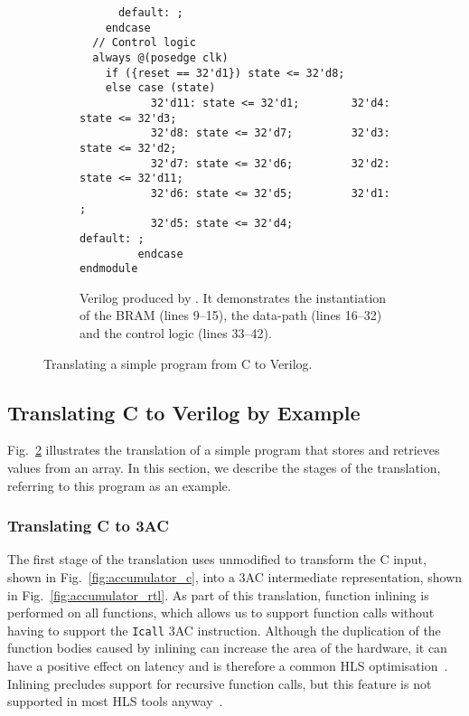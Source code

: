 \begin{figure}
\begin{subfigure}[b]{0.65\linewidth}
\begin{verbatim}
      default: ;
    endcase
  // Control logic
  always @(posedge clk)
    if ({reset == 32'd1}) state <= 32'd8;
    else case (state)
           32'd11: state <= 32'd1;        32'd4: state <= 32'd3;
           32'd8: state <= 32'd7;         32'd3: state <= 32'd2;
           32'd7: state <= 32'd6;         32'd2: state <= 32'd11;
           32'd6: state <= 32'd5;         32'd1: ;
           32'd5: state <= 32'd4;         default: ;
         endcase
endmodule
\end{verbatim}
\caption{Verilog produced by \vericert{}. It demonstrates the instantiation of the \gls{BRAM} (lines 9--15), the data-path (lines 16--32) and the control logic (lines 33--42).}\label{fig:accumulator_v}
\end{subfigure}
\caption{Translating a simple program from C to Verilog.}\label{fig:accumulator_c_rtl}
\end{figure}

\subsection{Translating C to Verilog by Example}
Fig.~\ref{fig:accumulator_c_rtl} illustrates the translation of a simple program that stores and retrieves values from an array.
In this section, we describe the stages of the \vericert{} translation, referring to this program as an example.

\subsubsection{Translating C to 3AC}

The first stage of the translation uses unmodified \compcert{} to transform the C input, shown in Fig.~\ref{fig:accumulator_c}, into a 3AC intermediate representation, shown in Fig.~\ref{fig:accumulator_rtl}.
As part of this translation, function inlining is performed on all functions, which allows us to support function calls without having to support the \texttt{Icall} 3AC instruction.  Although the duplication of the function bodies caused by inlining can increase the area of the hardware, it can have a positive effect on latency and is therefore a common HLS optimisation~\cite{noronha17_rapid_fpga}. Inlining precludes support for recursive function calls, but this feature is not supported in most HLS tools anyway~\cite{davidthomas_asap16}.

